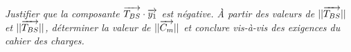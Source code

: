 \documentclass[10pt,fleqn]{article} %
\newif\ifnormal
\begin{document}
\begin{multicols}{2}
\begin{multicols}{2}
\subparagraph{}\textit{Justifier que la composante $\overrightarrow{T_{BS}}\cdot \overrightarrow{y_1}$ est négative. À partir des valeurs de $||\overrightarrow{T_{BS}}||$ et $||\overrightarrow{T_{BS}}||$, déterminer la valeur de $||\overrightarrow{C_m}||$ et conclure vis-à-vis des exigences du cahier des charges.}
\ifprof
\begin{corrige}
\end{corrige}
\else
\fi


%

%
%
%
%


\ifprof
\end{multicols}
\else
\end{multicols}
\fi
\end{document}
